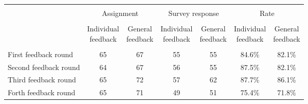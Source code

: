 \begin{tabular}{lcccccc}
\hline\hline     \\[-1.8ex]
& \multicolumn{2}{c}{Assignment} & \multicolumn{2}{c}{Survey response} & \multicolumn{2}{c}{Rate}       \\
\cline{2-7} \\[-1.8ex]
& \shortstack{Individual\\feedback}    & \shortstack{General\\feedback}    & \shortstack{Individual\\feedback}    & \shortstack{General\\feedback}   & \shortstack{Individual\\feedback}    & \shortstack{General\\feedback} \\
\hline \\[-1.8ex]
First feedback round   &       65 &       67 &       55 &       55 &     84.6\% &     82.1\%  \\
Second feedback round  &       64 &       67 &       56 &       55 &     87.5\% &     82.1\%  \\
Third feedback round    &       65 &       72 &       57 &       62 &     87.7\% &     86.1\%  \\
Forth feedback round    &       65 &       71 &       49 &       51 &     75.4\% &     71.8\%  \\
\hline\hline
\end{tabular}